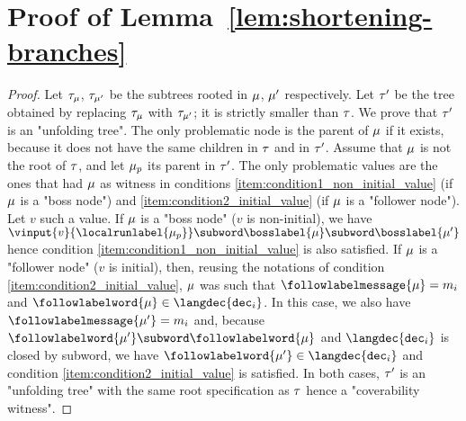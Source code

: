 \section{Proof of Lemma~\ref{lem:shortening-branches}}
\label{app:proofs-reduction-branches}

\lemShorteningBranches*

\begin{proof}
	Let $\tau_{\mu}$, $\tau_{\mu'}$ be the subtrees rooted in $\mu$, $\mu'$ respectively. 
	Let $\tau'$ be the tree obtained by replacing $\tau_{\mu}$ with $\tau_{\mu'}$; it is strictly smaller than $\tau$. We prove that $\tau'$ is an "unfolding tree".
	The only problematic node is the parent of $\mu$ if it exists, because it does not have the same children in $\tau$ and in $\tau'$. Assume that $\mu$ is not the root of $\tau$, and let $\mu_p$ its parent in $\tau'$.
	The only problematic values are the ones that had $\mu$ as witness in conditions \ref{item:condition1_non_initial_value} (if $\mu$ is a "boss node") and \ref{item:condition2_initial_value} (if $\mu$ is a "follower node"). Let $v$ such a value. 
	If $\mu$ is a "boss node" ($v$ is non-initial), we have $\vinput{v}{\localrunlabel{\node_p}} \subword \bosslabel{\node} \subword \bosslabel{\node'}$ hence condition \ref{item:condition1_non_initial_value} is also satisfied. If $\mu$ is a "follower node" ($v$ is initial), then, reusing the notations of condition \ref{item:condition2_initial_value}, $\mu$ was such that $\followlabelmessage{\node} = m_i$ and $\followlabelword{\node} \in \langdec{\decsymb_i}$. In this case, we also have $\followlabelmessage{\node'} = m_i$ and, because $\followlabelword{\node'} \subword \followlabelword{\node}$ and $\langdec{\decsymb_i}$ is closed by subword, we have $\followlabelword{\node'} \in \langdec{\decsymb_i}$ and condition \ref{item:condition2_initial_value} is satisfied. In both cases, $\tau'$ is an "unfolding tree" with the same root specification as $\tau$ hence a "coverability witness".
\end{proof}

